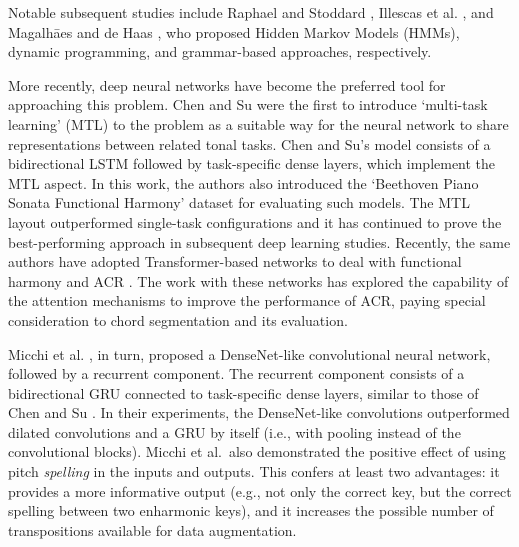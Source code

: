 Notable subsequent studies include Raphael and Stoddard
\parencite{raphael2004functional}, Illescas et al.
\parencite{illescas2007harmonic}, and Magalh\=aes and de Haas
\parencite{magalhaes2011functional}, who proposed Hidden Markov
Models (HMMs), dynamic programming, and grammar-based
approaches, respectively.

More recently, deep neural networks have become the
preferred tool for approaching this problem. Chen and Su
\parencite{chen2018functional} were the first to introduce
`multi-task learning' (MTL) \parencite{ruder2017overview} to the
problem as a suitable way for the neural network to share
representations between related tonal tasks. Chen and Su's
model consists of a bidirectional LSTM
\parencite{hochreiter1997long} followed by task-specific dense
layers, which implement the MTL aspect. In this work, the
authors also introduced the `Beethoven Piano Sonata
Functional Harmony' dataset for evaluating such models. The
MTL layout outperformed single-task configurations and it
has continued to prove the best-performing approach in
subsequent deep learning studies. Recently, the same authors
have adopted Transformer-based networks to deal with
functional harmony and ACR \parencite{chen2019harmony,
chen2021attend}. The work with these networks has explored
the capability of the attention mechanisms to improve the
performance of ACR, paying special consideration to chord
segmentation and its evaluation.

Micchi et al. \parencite{micchi2020not}, in turn, proposed a
DenseNet-like \parencite{huang2017densely} convolutional neural
network, followed by a recurrent component. The recurrent
component consists of a bidirectional GRU
\parencite{cho2014learning} connected to task-specific dense
layers, similar to those of Chen and Su
\parencite{chen2018functional}. In their experiments, the
DenseNet-like convolutions outperformed dilated convolutions
and a GRU by itself (i.e., with pooling instead of the
convolutional blocks). Micchi et al.~also demonstrated the
positive effect of using pitch \textit{spelling} in the
inputs and outputs. This confers at least two advantages: it
provides a more informative output (e.g., not only the
correct key, but the correct spelling between two enharmonic
keys), and it increases the possible number of
transpositions available for data augmentation.

